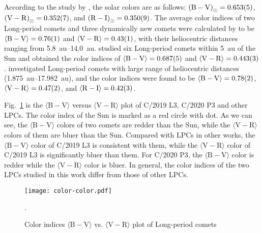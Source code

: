 According to the study by \cite{ramirez_ubvric_2012}, the solar colors are as follows: 
${(\mathrm{B-V})}_{\odot} = \num{0.653 +- 0.005}$, 
${(\mathrm{V-R})}_{\odot} = \num{0.352 +- 0.007}$, and 
${(\mathrm{R-I})}_{\odot} = \num{0.350 +- 0.009}$. 
The average color indices of two Long-period comets and three dynamically new comets were calculated by \cite{meech_activity_2009} to be 
$\langle \mathrm{B-V} \rangle = \num{0.76 +- 0.01}$ and 
$\langle \mathrm{V-R} \rangle = \num{0.43 +- 0.01}$, 
with their heliocentric distances ranging from \qtyrange{5.8}{14.0}{\astronomicalunit}. 
\cite{solontoi_ensemble_2012} studied six Long-period comets within \qty{5}{\astronomicalunit} of the Sun and obtained the color indices of 
$\langle \mathrm{B-V} \rangle = \num{0.687 +- 0.005}$ and 
$\langle \mathrm{V-R} \rangle = \num{0.443 +- 0.003}$. 
\cite{jewittCOLORSYSTEMATICSCOMETS2015} investigated Long-period comets with large range of heliocentric distances (\qtyrange{1.875}{17.982}{\astronomicalunit}), and the color indices were found to be 
$\langle \mathrm{B-V} \rangle = \num{0.78 +- 0.02}$, 
$\langle \mathrm{V-R} \rangle = \num{0.47 +- 0.02}$, and 
$\langle \mathrm{R-I} \rangle = \num{0.42 +- 0.03}$. 


Fig.~\ref{fig:color-color} is the $\langle \mathrm{B-V} \rangle$ versus $\langle \mathrm{V-R} \rangle$ plot of C/2019 L3, C/2020 P3 and other LPCs. 
The color index of the Sun \citep{ramirez_ubvric_2012} is marked as a red circle with dot. 
As we can see, the $\langle \mathrm{B-V} \rangle$ colors of two comets are redder than the Sun, while the $\langle \mathrm{V-R} \rangle$ colors of them are bluer than the Sun. 
Compared with LPCs in other works, the $\langle \mathrm{B-V} \rangle$ color of C/2019 L3 is consistent with them, while the $\langle \mathrm{V-R} \rangle$ color of C/2019 L3 is significantly bluer than them. For C/2020 P3, the $\langle \mathrm{B-V} \rangle$ color is redder while the $\langle \mathrm{V-R} \rangle$ color is bluer. 
In general, the color indices of the two LPCs studied in this work differ from those of other LPCs. 



\begin{figure}
    \centering
    \texttt{[image: color-color.pdf]}
    \caption{Color indices $\langle \mathrm{B-V} \rangle$ vs. $\langle \mathrm{V-R} \rangle$ plot of Long-period comets}.\label{fig:color-color}
\end{figure}

